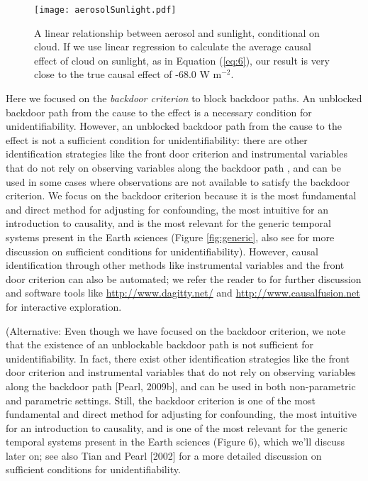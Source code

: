 \documentclass[12pt]{article}
\begin{document}
\begin{figure} \texttt{[image: aerosolSunlight.pdf]}
  \caption{A linear relationship between aerosol and sunlight,
    conditional on cloud. If we use linear regression to calculate the
    average causal effect of cloud on sunlight, as in Equation
    (\ref{eq:6}), our result is very close to the true causal effect of
    -68.0 W m$^{-2}$.}
  \label{fig:linear}
\end{figure}

Here we focused on the \emph{backdoor criterion} to block backdoor
paths. An unblocked backdoor path from the cause to the effect is a
necessary condition for unidentifiability. However, an unblocked
backdoor path from the cause to the effect is not a sufficient
condition for unidentifiability: there are other identification
strategies like the front door criterion and instrumental variables
that do not rely on observing variables along the backdoor path
\citep{pearl2009causality}, and can be used in some cases where
observations are not available to satisfy the backdoor criterion. We
focus on the backdoor criterion because it is the most fundamental and
direct method for adjusting for confounding, the most intuitive for an
introduction to causality, and is the most relevant for the generic
temporal systems present in the Earth sciences (Figure
\ref{fig:generic}, also see \citet{tian2002general} for more
discussion on sufficient conditions for unidentifiability). However,
causal identification through other methods like instrumental
variables and the front door criterion can also be automated; we refer
the reader to \citet{pearl2009causality} for further discussion and
software tools like \url{http://www.dagitty.net/} and
\url{http://www.causalfusion.net} for interactive exploration.

(Alternative: Even though we have focused on the backdoor criterion,
we note that the existence of an unblockable backdoor path is not
sufficient for unidentifiability. In fact, there exist other
identification strategies like the front door criterion and
instrumental variables that do not rely on observing variables along
the backdoor path [Pearl, 2009b], and can be used in both
non-parametric and parametric settings. Still, the backdoor criterion
is one of the most fundamental and direct method for adjusting for
confounding, the most intuitive for an introduction to causality, and
is one of the most relevant for the generic temporal systems present
in the Earth sciences (Figure 6), which we’ll discuss later on; see
also Tian and Pearl [2002] for a more detailed discussion on
sufficient conditions for unidentifiability.
\end{document}
